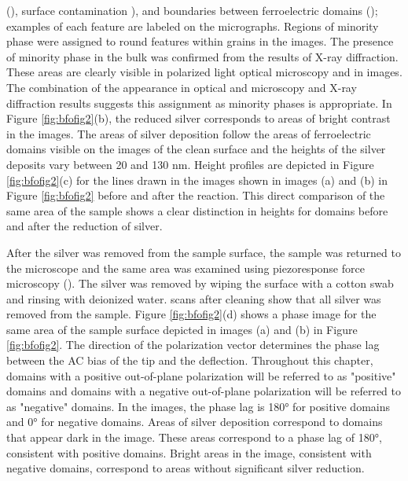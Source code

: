 (), surface contamination ), and boundaries between ferroelectric
domains ();\cite{Catalan:2009ca} examples of each feature are labeled on the
micrographs. \label{minorityphase}Regions of minority phase were assigned to round
features within grains in the  images. The presence of minority phase in the
bulk was confirmed from the results of X-ray diffraction. These areas are clearly visible
in polarized light optical microscopy and in  images. The combination of the
appearance in optical and  microscopy and X-ray diffraction results suggests
this assignment as minority phases is appropriate. In Figure \ref{fig:bfofig2}(b), the
reduced silver corresponds to areas of bright contrast in the  images. The areas
of silver deposition follow the areas of ferroelectric domains visible on the images of
the clean surface and the heights of the silver deposits vary between 20 and 130 nm.
Height profiles are depicted in Figure \ref{fig:bfofig2}(c) for the lines drawn in the
 images shown in images (a) and (b) in Figure \ref{fig:bfofig2} before and after
the reaction. This direct comparison of the same area of the sample shows a clear
distinction in heights for domains before and after the reduction of silver.

After the silver was removed from the sample surface, the sample was returned to the
microscope and the same area was examined using piezoresponse force microscopy
(). The silver was removed by wiping the surface with a cotton swab and rinsing
with deionized water.  scans after cleaning show that all silver was removed
from the sample. Figure \ref{fig:bfofig2}(d) shows a  phase image for the same
area of the sample surface depicted in images (a) and (b) in Figure \ref{fig:bfofig2}. The
direction of the polarization vector determines the phase lag between the AC bias of the
tip and the deflection. Throughout this chapter, domains with a positive out-of-plane
polarization will be referred to as "positive" domains and domains with a negative
out-of-plane polarization will be referred to as "negative" domains. In the 
images, the phase lag is 180\si{\degree} for positive domains and 0\si{\degree} for
negative domains.\cite{Kalinin:2002hq,Kalinin:2006bg,Kalinin:2001jg,Kalinin:2004hu} Areas
of silver deposition correspond to domains that appear dark in the  image. These
areas correspond to a phase lag of 180\si{\degree}, consistent with positive domains.
Bright areas in the  image, consistent with negative domains, correspond to
areas without significant silver reduction.

